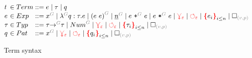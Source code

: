 \documentclass[nonacm, acmsmall, screen, review]{acmart}
\newcommand{\e}{\varepsilon}
\newcommand{\id}[1]{\textcolor{gray}{\ensuremath{#1}}}
\newcommand{\eid}[2]{{#2}^{\id{#1}}}
\newcommand{\conflictHole}[1]{%
{\noexpandarg\StrSubstitute{#1}{,}{\textcolor{red}{\,\textbf{|}\,}}[\myargs]%
{\textcolor{red}{\textbf{\{}}\myargs\textcolor{red}{\textbf{\}}}}}}%
\newcommand{\emptyHole}[2]{\square_{\id{(#1, #2)}}}
\newcommand{\eVar}[2]{\eid{#1}{#2}}
\newcommand{\eFun}[4]{\eid{#1}{\lambda} #2 : #3 . #4}
\newcommand{\eApp}[3]{\eid{#1}{\left(#2~#3\right)}}
\newcommand{\eNum}[2]{\eid{#1}{\underline{#2}}}
\newcommand{\ePlus}[3]{#2~\eid{#1}{\texttt{+}}~#3}
\newcommand{\eTimes}[3]{#2~\eid{#1}{\texttt{*}}~#3}
\newcommand{\pVar}[2]{\eid{#1}{#2}}
\newcommand{\tArrow}[3]{#2 \eid{#1}{\rightarrow} #3}
\newcommand{\tNum}[1]{\eid{#1}{Num}}
\newcommand{\multiVertex}[1]{\textcolor{red}{\ensuremath{\curlyveedownarrow_{#1}}}}
\newcommand{\cycleVertex}[1]{\textcolor{red}{\ensuremath{\circlearrowleft_{#1}}}}
\begin{document}
\begin{figure}
  \[
    \arraycolsep=0pt
    \begin{array}{lcllll}
      t & {}\in{} & Term & {}::={} &
        e
        \mid \tau
        \mid q
      \\
      e & {}\in{} & Exp & {}::={} &
        \eVar{G}{x}
        \mid \eFun{G}{q}{\tau}{e}
        \mid \eApp{G}{e}{e}
        \mid \eNum{G}{n}
        \mid \ePlus{G}{e}{e}
        \mid \eTimes{G}{e}{e}
        \mid \multiVertex{\e}
        \mid \cycleVertex{\e}
        \mid \conflictHole{e_i}_{i \leq n}
        \mid \emptyHole{v}{p}
      \\
      \tau & {}\in{} & Typ & {}::={} &
        \tArrow{G}{\tau}{\tau}
        \mid \tNum{G}
        \mid \multiVertex{\e}
        \mid \cycleVertex{\e}
        \mid \conflictHole{\tau_i}_{i \leq n}
        \mid \emptyHole{v}{p}
      \\
      q & {}\in{} & Pat{} & {}::={} &
        \pVar{G}{x}
        \mid \multiVertex{\e}
        \mid \cycleVertex{\e}
        \mid \conflictHole{q_i}_{i \leq n}
        \mid \emptyHole{v}{p}
      \\
    \end{array}
  \]  
  \caption{Term syntax}
  \label{fig:Term syntax}
\end{figure}%



\end{document}
